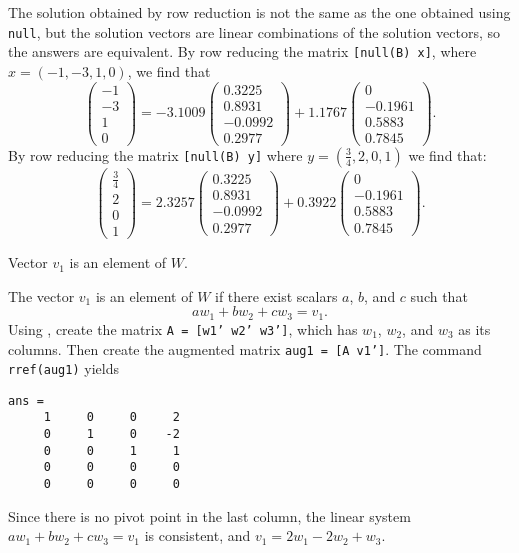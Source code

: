The solution obtained by row reduction is not the same as the one
obtained using {\tt null}, but the solution vectors are linear
combinations of the \Matlab solution vectors, so the answers are
equivalent.  By row reducing the matrix {\tt [null(B) x]}, where
$x = (-1,-3,1,0)$, we find that
\[
\left(\begin{array}{r} -1 \\ -3 \\ 1 \\ 0 \end{array}\right) =
-3.1009\left(\begin{array}{r} 0.3225 \\ 0.8931 \\ -0.0992 \\ 0.2977
\end{array}\right) + 1.1767\left(\begin{array}{r} 0 \\ -0.1961 \\
0.5883 \\ 0.7845 \end{array}\right).
\]
By row reducing the matrix {\tt [null(B) y]} where $y = (\frac{3}{4},
2,0,1)$ we find that:
\[
\left(\begin{array}{r} \frac{3}{4} \\ 2 \\ 0 \\ 1 \end{array}\right) =
2.3257\left(\begin{array}{r} 0.3225 \\ 0.8931 \\ -0.0992 \\ 0.2977
\end{array}\right) + 0.3922\left(\begin{array}{r} 0 \\ -0.1961 \\
0.5883 \\ 0.7845 \end{array}\right).
\]

 \ans Vector $v_1$ is an element of $W$.

\soln The vector $v_1$ is an element of $W$ if there exist scalars $a$,
$b$, and $c$ such that
\[
aw_1 + bw_2 + cw_3 = v_1.
\]
Using \Matlab, create the matrix {\tt A = [w1' w2' w3']}, which has
$w_1$, $w_2$, and $w_3$ as its columns.  Then create the augmented
matrix {\tt aug1 = [A v1']}.  The command {\tt rref(aug1)} yields
\begin{verbatim}
ans =
     1     0     0     2
     0     1     0    -2
     0     0     1     1
     0     0     0     0
     0     0     0     0
\end{verbatim}
Since there is no pivot point in the last column, the linear system
$aw_1 + bw_2 + cw_3 = v_1$ is consistent, and $v_1 = 2w_1 - 2w_2 + w_3$.

